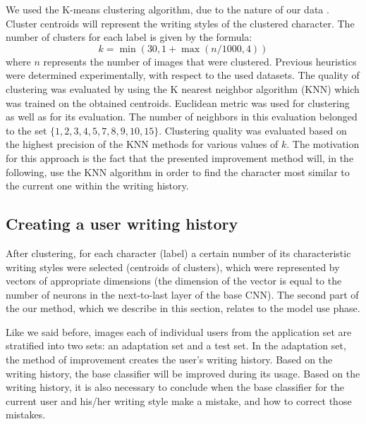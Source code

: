 \documentclass{article}
\begin{document}
We used the K-means clustering algorithm, due to the nature of our data \citep{kmeans}.
Cluster centroids will represent the writing styles of the clustered character.
The number of clusters for each label is given by the formula:
\begin{equation}
  k = \min(30, 1+\max(n/1000, 4))
\end{equation}
where $n$ represents the number of images that were clustered.
Previous heuristics were determined experimentally, with respect to the used datasets.
The quality of clustering was evaluated by using the K nearest neighbor algorithm (KNN) which was trained on the obtained centroids.
Euclidean metric was used for clustering as well as for its evaluation.
The number of neighbors in this evaluation belonged to the set $\{1,2,3,4,5,7,8,9,10,15\}$.
Clustering quality was evaluated based on the highest precision of the KNN methods for various values of $k$.
The motivation for this approach is the fact that the presented improvement method will, in the following, use the KNN algorithm in order to find the character most similar to the current one within the writing history.

\subsection{Creating a user writing history}

After clustering, for each character (label) a certain number of its characteristic writing styles were selected (centroids of clusters), which were represented by vectors of appropriate dimensions
(the dimension of the vector is equal to the number of neurons in the next-to-last layer of the base CNN).
The second part of the our method, which we describe in this section, relates to the model use phase.

Like we said before, images each of individual users from the application set are stratified into two sets: an adaptation set and a test set. 
In the adaptation set, the method of improvement creates the user's writing history. 
Based on the writing history, the base classifier will be improved during its usage. 
Based on the writing history, it is also necessary to conclude when the base classifier for the current user and his/her writing style make a mistake, and how to correct those mistakes.
\end{document}
